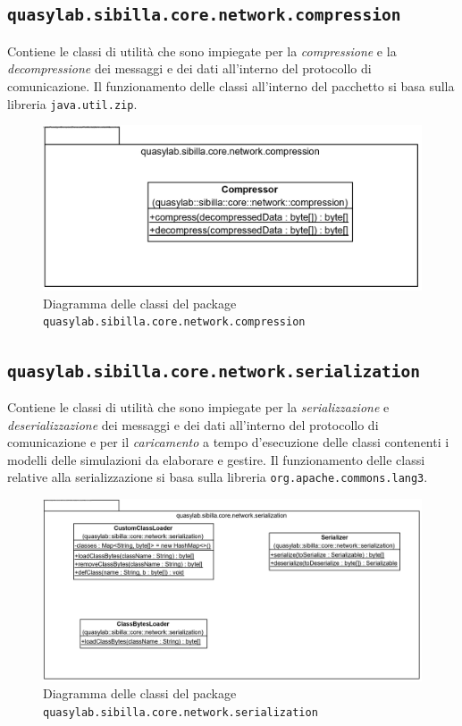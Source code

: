 \subsection{\texttt{quasylab.sibilla.core.network.compression}} Contiene le classi di utilità che sono impiegate per la \emph{compressione} e la \emph{decompressione} dei messaggi e dei dati all’interno del protocollo di comunicazione. Il funzionamento delle classi all’interno del pacchetto si basa sulla libreria \texttt{java.util.zip}.

\begin{figure}[H]
    \includegraphics[width=\linewidth]{images/quasylab.sibilla.core.network.compression.png}
    \captionsetup{justification=centering}
    \caption{Diagramma delle classi del package \texttt{quasylab.sibilla.core.network.compression}}
  \end{figure}

\subsection{\texttt{quasylab.sibilla.core.network.serialization}} Contiene le classi di utilità che sono impiegate per la \emph{serializzazione} e \emph{deserializzazione} dei messaggi e dei dati all’interno del protocollo di comunicazione e per il \emph{caricamento} a tempo d’esecuzione delle classi contenenti i modelli delle simulazioni da elaborare e gestire. Il funzionamento delle classi relative alla serializzazione si basa sulla libreria \texttt{org.apache.commons.lang3}.

\begin{figure}[H]
    \includegraphics[width=\linewidth]{images/quasylab.sibilla.core.network.serialization.png}
    \captionsetup{justification=centering}
    \caption{Diagramma delle classi del package \texttt{quasylab.sibilla.core.network.serialization}}
  \end{figure}

